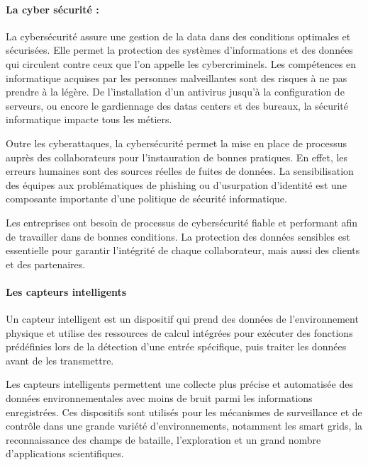 \paragraph{La cyber sécurité :}

La cybersécurité assure une gestion de la data dans des conditions optimales et sécurisées. Elle permet la protection des systèmes d’informations et des données qui circulent contre ceux que l’on appelle les cybercriminels. Les compétences en informatique acquises par les personnes malveillantes sont des risques à ne pas prendre à la légère. De l’installation d’un antivirus jusqu’à la configuration de serveurs, ou encore le gardiennage des datas centers et des bureaux, la sécurité informatique impacte tous les métiers\cite{CybersecuriteDefinitionCybersecurite}.

Outre les cyberattaques, la cybersécurité permet la mise en place de processus auprès des collaborateurs pour l’instauration de bonnes pratiques. En effet, les erreurs humaines sont des sources réelles de fuites de données. La sensibilisation des équipes aux problématiques de phishing ou d’usurpation d’identité est une composante importante d’une politique de sécurité informatique.

Les entreprises ont besoin de processus de cybersécurité fiable et performant afin de travailler dans de bonnes conditions. La protection des données sensibles est essentielle pour garantir l’intégrité de chaque collaborateur, mais aussi des clients et des partenaires.

\newpage
\paragraph{Les capteurs intelligents}

Un capteur intelligent est un dispositif qui prend des données de l’environnement physique et utilise des ressources de calcul intégrées pour exécuter des fonctions prédéfinies lors de la détection d’une entrée spécifique, puis traiter les données avant de les transmettre.

Les capteurs intelligents permettent une collecte plus précise et automatisée des données environnementales avec moins de bruit parmi les informations enregistrées. Ces dispositifs sont utilisés pour les mécanismes de surveillance et de contrôle dans une grande variété d’environnements, notamment les smart grids, la reconnaissance des champs de bataille, l’exploration et un grand nombre d’applications scientifiques.

